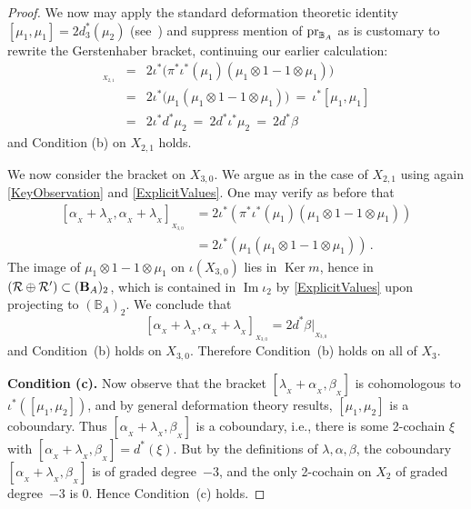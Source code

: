 \documentclass[11pt]{amsart}
\numberwithin{equation}{section}
\DeclareMathOperator{\Ima}{Im}
\DeclareMathOperator{\Ker}{Ker}
\newcommand{\X}{_X}
\newcommand{\alphax}{\alpha_{\X}}
\newcommand{\betax}{\beta_{\X}}
\newcommand{\lambdax}{\lambda_{\X}}
\newcommand{\pr}{ {\rm{pr}} }%
\newcommand{\R}{\mathcal{R}}
\newcommand{\B}{{\bf B}} %
\newcommand{\BB}{\mathbb{B}} %
\renewcommand{\_}[1]{\mbox{$_{\left( #1 \right)}$}}
\newcommand{\ot}{\otimes}
\begin{document}
{\begin{proof}
We now may apply the standard deformation theoretic identity
$[ \mu_1 , \mu_1 ] = 2 d_3^*(\mu_2)$
(see~\cite{GerstenhaberSchack}) and suppress mention of 
$\pr_{\BB_A}$ as is customary to rewrite the Gerstenhaber bracket,
continuing our earlier calculation:
\begin{eqnarray*}
  [\alphax + \lambdax, \alphax+\lambdax]_{_{X_{2,1}}}
  & = &
          2\iota^* \big(\pi^*\iota^*(\mu_1)  (\mu_1\ot 1 - 1\ot \mu_1)\big)\\
  &  = & 2 \iota^*\big( \mu_1(\mu_1\ot 1 - 1\ot \mu_1)\big)
        \  =\ \iota^* [\mu_1, \mu_1]\\
& = & 2 \iota^* d^* \mu_2
 \ =\ 2 d^* \iota^* \mu_2
 \ =\ 2 d^* \beta
 \, 
\end{eqnarray*}
and Condition (b) on $X_{2,1}$ holds.

We now consider the bracket on $X_{3,0}$.
We argue as in the case of $X_{2,1}$
using again \cref{KeyObservation} and
 \cref{ExplicitValues}.
One may verify as before that
$$\begin{aligned}
  [\alphax + \lambdax , \alphax + \lambdax ] _{_{X_{3,0}}} 
  &= 2 \iota^* ( \pi^*\iota^* (\mu_1)  (\mu_1\ot 1 - 1\ot\mu_1))\\
  &= 2 \iota^* (\mu_1  (\mu_1\ot 1 - 1\ot\mu_1))
  \, .
\end{aligned}
$$
The image of $\mu_1\ot 1 - 1\ot \mu_1$ on $\iota (X_{3,0})$
lies in $\Ker m$,
hence in $(\R \oplus \R')\subset (\B_A)_2$,
which is contained in $\Ima \iota_2$ by \cref{ExplicitValues}
upon projecting to $(\BB_A)_2$.
We conclude that
$$[\alphax + \lambdax , \alphax+\lambdax ] _{_{X_{3,0}}} =
2d^* \beta\big|_{_{X_{3,0}}}
$$
and Condition~(b) holds on $X_{3,0}$.
Therefore Condition~(b) holds on all of $X_3$. 
\vspace{2ex}

{\bf Condition (c).}
Now observe that
the bracket $[\lambdax+\alphax, \betax]$ is cohomologous to 
$\iota^*([\mu_1,\mu_2])$,
and by general deformation theory results, $[\mu_1,\mu_2]$ 
is a coboundary.
Thus $[\alphax+\lambdax,\betax]$ is a coboundary,
i.e., there is some 2-cochain $\xi$ with $[\alphax + \lambdax, \betax]=d^*(\xi)$.
But by the definitions of $\lambda, \alpha,\beta$, the coboundary 
$[\alphax +\lambdax,\betax]$ is of graded degree~$-3$, and 
the only 2-cochain on $X_2$ of graded degree~$-3$ is $0$.
Hence Condition~(c) holds. 
\end{proof}

}
\end{document}
